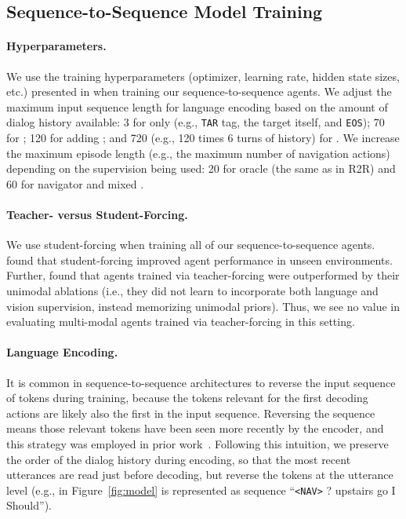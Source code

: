 \documentclass{article}
\begin{document}
\subsection{Sequence-to-Sequence Model Training}

\paragraph{Hyperparameters.}
We use the training hyperparameters (optimizer, learning rate, hidden state sizes, etc.) presented in \citet{anderson:cvpr18} when training our sequence-to-sequence agents.
We adjust the maximum input sequence length for language encoding based on the amount of dialog history available: 3 for  only (e.g., \texttt{TAR} tag, the target itself, and \texttt{EOS}); 70 for ; 120 for adding ; and 720 (e.g., 120 times 6 turns of history) for .
We increase the maximum episode length (e.g., the maximum number of navigation actions) depending on the supervision being used: 20 for oracle  (the same as in R2R) and 60 for navigator  and mixed .

\paragraph{Teacher- versus Student-Forcing.}
We use student-forcing when training all of our sequence-to-sequence agents.
\citet{anderson:cvpr18} found that student-forcing improved agent performance in unseen environments.
Further, \citet{thomason:naacl19} found that agents trained via teacher-forcing were outperformed by their unimodal ablations (i.e., they did not learn to incorporate both language and vision supervision, instead memorizing unimodal priors).
Thus, we see no value in evaluating multi-modal agents trained via teacher-forcing in this setting.

\paragraph{Language Encoding.}
It is common in sequence-to-sequence architectures to reverse the input sequence of tokens during training, because the tokens relevant for the first decoding actions are likely also the first in the input sequence.
Reversing the sequence means those relevant tokens have been seen more recently by the encoder, and this strategy was employed in prior work~\cite{anderson:cvpr18}.
Following this intuition, we preserve the order of the dialog history during encoding, so that the most recent utterances are read just before decoding, but reverse the tokens at the utterance level (e.g.,  in Figure~\ref{fig:model} is represented as sequence ``\texttt{<NAV>} ? upstairs go I Should'').
\end{document}
